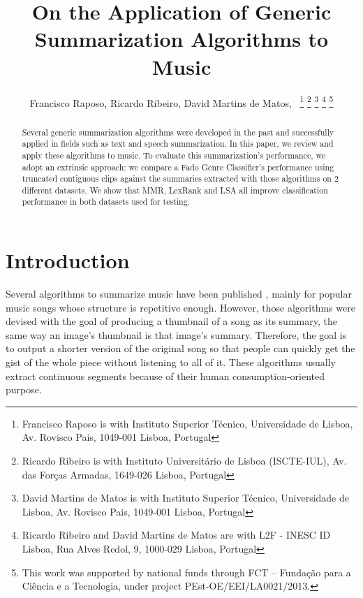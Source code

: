 \documentclass[11pt,onecolumn,draftcls]{IEEEtran}
\begin{document}

\title{On the Application of Generic Summarization Algorithms to Music}
\author{Francisco Raposo,
				Ricardo Ribeiro,
				David Martins de Matos,~
\thanks{Francisco Raposo is with Instituto Superior Técnico, Universidade de Lisboa, Av. Rovisco Pais, 1049-001 Lisboa, Portugal}
\thanks{Ricardo Ribeiro is with Instituto Universitário de Lisboa (ISCTE-IUL), Av. das Forças Armadas, 1649-026 Lisboa, Portugal}
\thanks{David Martins de Matos is with Instituto Superior Técnico, Universidade de Lisboa, Av. Rovisco Pais, 1049-001 Lisboa, Portugal}
\thanks{Ricardo Ribeiro and David Martins de Matos are with L2F - INESC ID Lisboa, Rua Alves Redol, 9, 1000-029 Lisboa, Portugal}
\thanks{This work was supported by national funds through FCT -- Fundação para a Ciência e a Tecnologia, under project PEst-OE/EEI/LA0021/2013.}}
\maketitle

\begin{abstract}
Several generic summarization algorithms were developed in the past and
successfully applied in fields such as text and speech summarization. In this
paper, we review and apply these algorithms to music. To evaluate this
summarization's performance, we adopt an extrinsic approach: we compare a Fado
Genre Classifier's performance using truncated contiguous clips against the
summaries extracted with those algorithms on 2 different datasets. We show that
\ac{MMR}, LexRank and \ac{LSA} all improve classification performance in both
datasets used for testing.
\end{abstract}

\section{Introduction}
Several algorithms to summarize music have been published
\cite{Chai,Cooper2003,Peeters2002,Peeters2003,Chu2000,Cooper2002,Glaczynski2011,Bartsch2005},
mainly for popular music songs whose structure is repetitive enough. However,
those algorithms were devised with the goal of producing a thumbnail of a song
as its summary, the same way an image's thumbnail is that image's summary.
Therefore, the goal is to output a shorter version of the original song so that
people can quickly get the gist of the whole piece without listening to all of
it. These algorithms usually extract continuous segments because of their human
consumption-oriented purpose.
\end{document}
